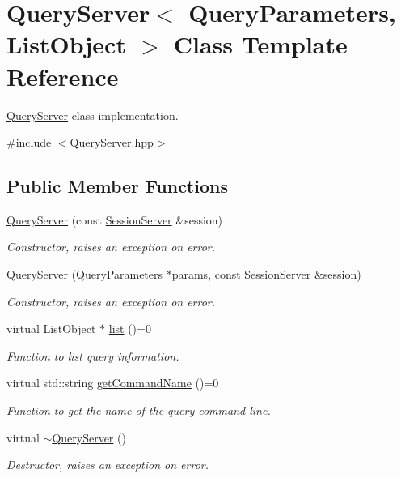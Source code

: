 \hypertarget{classQueryServer}{
\section{QueryServer$<$ QueryParameters, ListObject $>$ Class Template Reference}
\label{classQueryServer}
}


\hyperlink{classQueryServer}{QueryServer} class implementation.  




{\ttfamily \#include $<$QueryServer.hpp$>$}

\subsection*{Public Member Functions}
\begin{DoxyCompactItemize}
\item 
\hyperlink{classQueryServer_a52662d49ca1ee424c925bd2bb56067ae}{QueryServer} (const \hyperlink{classSessionServer}{SessionServer} \&session)
\begin{DoxyCompactList}\small\item\em Constructor, raises an exception on error. \item\end{DoxyCompactList}\item 
\hyperlink{classQueryServer_a17571a8b25426721f8b301cc05329ca1}{QueryServer} (QueryParameters $\ast$params, const \hyperlink{classSessionServer}{SessionServer} \&session)
\begin{DoxyCompactList}\small\item\em Constructor, raises an exception on error. \item\end{DoxyCompactList}\item 
virtual ListObject $\ast$ \hyperlink{classQueryServer_a2ad0f3f1b75e6f0705a9edbe4bab76b0}{list} ()=0
\begin{DoxyCompactList}\small\item\em Function to list query information. \item\end{DoxyCompactList}\item 
virtual std::string \hyperlink{classQueryServer_ad6b15831bd35508c3b5a393062d6e206}{getCommandName} ()=0
\begin{DoxyCompactList}\small\item\em Function to get the name of the query command line. \item\end{DoxyCompactList}\item 
\hypertarget{classQueryServer_a5e207567c6ce02000e949e277b54e2d3}{
virtual \hyperlink{classQueryServer_a5e207567c6ce02000e949e277b54e2d3}{$\sim$QueryServer} ()}
\label{classQueryServer_a5e207567c6ce02000e949e277b54e2d3}

\begin{DoxyCompactList}\small\item\em Destructor, raises an exception on error. \item\end{DoxyCompactList}\end{DoxyCompactItemize}
